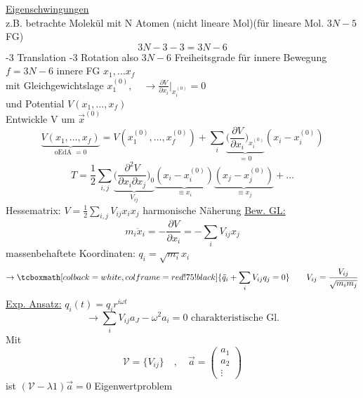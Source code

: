 \documentclass[titlepage,12pt,a4paper,ngerman]{report}
\newcommand{\ub}[1]{\underbrace{#1}}
\newcommand{\rmbox}[1]{\tcboxmath[colback=white,colframe=red!75!black]{#1}} %
\renewcommand{\boxed}{\rmbox}
\begin{document}
{\underline{Eigenschwingungen}\\
z.B. betrachte Molekül mit N Atomen (nicht lineare Mol)(für lineare Mol. $3N-5$ FG)
$$3N - 3 - 3 = 3N - 6$$
-3 Translation -3 Rotation also $3N-6$ Freiheitsgrade für innere Bewegung
$f = 3N-6$ innere FG $x_1, \dots x_f$\\
mit Gleichgewichtslage $x_1^{(0)}, \quad \rightarrow \frac{\partial V}{\partial x_i} \vert _{x_i^{(0)}} = 0$\\
und Potential $V(x_1,\dots, x_f)$\\
Entwickle V um $\vec{x}^{(0)}$\\
$$\underbrace{V(x_1,\dots , x_f)}_{\textrm{oEdA }= 0} = V(x_1^{(0)},\dots , x_f^{(0)}) + \sum_i \underbrace{\bigg(\frac{\partial V}{\partial x_i}\bigg)_{x_i^{(0)}}}_{= 0} (x_i - x_i^{(0)})$$
$$ T = \frac{1}{2} \sum _{i,j} \ub{\bigg(\frac{\partial^2 V}{\partial x_i \partial x_j} \bigg)_0}_{V_{ij}} \ub{(x_i - x_i^{(0)} )}_{\equiv x_i}  \ub{( x_j - x_j^{(0)})}_{\equiv x_j} + \dots $$
Hessematrix: $V = \frac{1}{2} \sum_{i,j} V_{ij} x_i x_j  $ harmonische Näherung
\underline{Bew. GL:} $$m_i\ddot{x}_i = -\frac{\partial V}{\partial x_i} = - \sum_i V_{ij} x_j$$
massenbehaftete Koordinaten: $ q_i = \sqrt{m_i} x_i$
$$\rightarrow \boxed{\ddot{q}_i + \sum_i V_{ij} q_j = 0} \qquad V_{ij} = \frac{V_{ij}}{\sqrt{m_i m_j}}$$
\underline{Exp. Ansatz:} $q_i (t) = q_i r^{i\omega t}$
$$\rightarrow \sum_i V_{ij} a_J - \omega^2 a_i = 0 \textrm{ charakteristische Gl.}$$
Mit $$\mathcal{V} = \{V_{ij}\} \quad , \quad \vec{a} = \begin{pmatrix}
a_1\\
a_2\\
\vdots
\end{pmatrix}$$
ist $(\mathcal{V} - \lambda 1)\vec{a}=0 $ Eigenwertproblem

}
\end{document}
